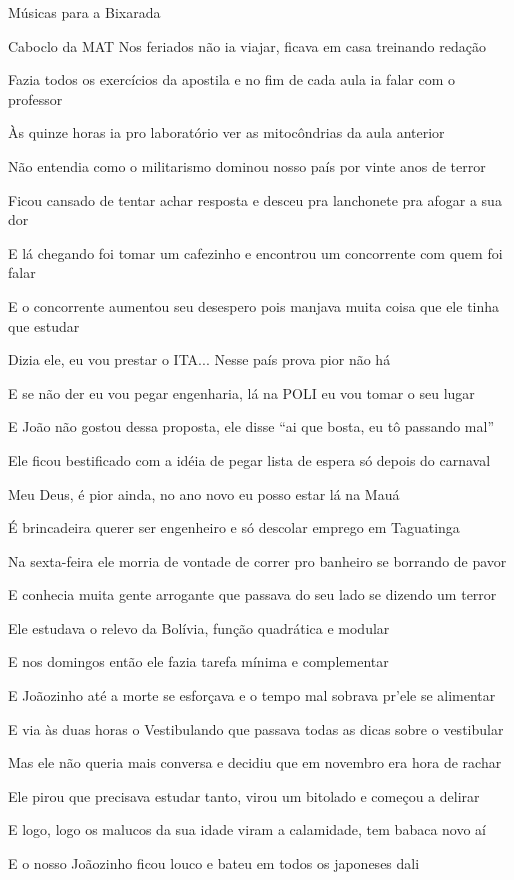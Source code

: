 \begin{secao}{Músicas para a Bixarada}
\begin{subsecao}{Caboclo da MAT}
Nos feriados não ia viajar, ficava em casa treinando redação

Fazia todos os exercícios da apostila e no fim de cada aula ia falar com o
professor

Às quinze horas ia pro laboratório ver as mitocôndrias da aula anterior

Não entendia como o militarismo dominou nosso país por vinte anos de terror

Ficou cansado de tentar achar resposta e desceu pra lanchonete pra afogar a sua
dor

E lá chegando foi tomar um cafezinho e encontrou um concorrente com quem foi
falar

E o concorrente aumentou seu desespero pois manjava muita coisa que ele tinha
que estudar

Dizia ele, eu vou prestar o ITA... Nesse país prova pior não há

E se não der eu vou pegar engenharia, lá na POLI eu vou tomar o seu lugar

E João não gostou dessa proposta, ele disse ``ai que bosta, eu tô passando mal''

Ele ficou bestificado com a idéia de pegar lista de espera só depois do carnaval

Meu Deus, é pior ainda, no ano novo eu posso estar lá na Mauá

É brincadeira querer ser engenheiro e só descolar emprego em Taguatinga

Na sexta-feira ele morria de vontade de correr pro banheiro se borrando de pavor

E conhecia muita gente arrogante que passava do seu lado se dizendo um terror

Ele estudava o relevo da Bolívia, função quadrática e modular

E nos domingos então ele fazia tarefa mínima e complementar

E Joãozinho até a morte se esforçava e o tempo mal sobrava pr'ele se alimentar

E via às duas horas o Vestibulando que passava todas as dicas sobre o vestibular

Mas ele não queria mais conversa e decidiu que em novembro era hora de rachar

Ele pirou que precisava estudar tanto, virou um bitolado e começou a delirar

E logo, logo os malucos da sua idade viram a calamidade, tem babaca novo aí

E o nosso Joãozinho ficou louco e bateu em todos os japoneses dali


\end{subsecao}
\end{secao}
